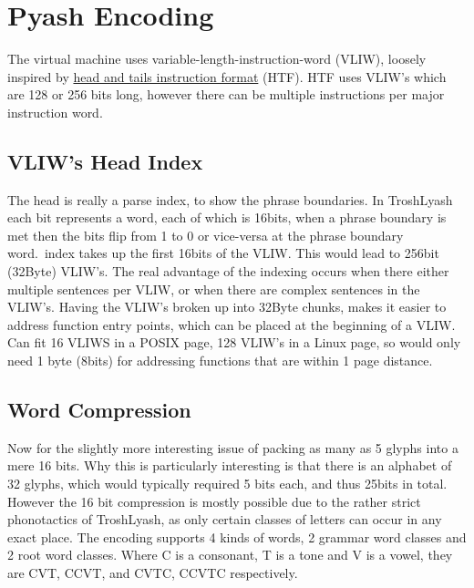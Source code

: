 %
\chapter{Pyash Encoding}

The virtual machine uses variable-length-instruction-word (VLIW),
loosely inspired by
\href{http://scale.eecs.berkeley.edu/papers/hat-cases2001.pdf}{head and
tails instruction format} (HTF). HTF uses VLIW's which are 128 or 256
bits long, however there can be multiple instructions per major
instruction word.

\section{VLIW's Head Index}\label{vliws-head-index}

The head is really a parse index, to show the phrase boundaries. In
TroshLyash each bit represents a word, each of which is 16bits, when a
phrase boundary is met then the bits flip from 1 to 0 or vice-versa at
the phrase boundary word.\ index takes up the first 16bits of the VLIW\@.
This would lead to 256bit (32Byte) VLIW's. The real advantage of the
indexing occurs when there either multiple sentences per VLIW, or when
there are complex sentences in the VLIW's. Having the VLIW's broken up
into 32Byte chunks, makes it easier to address function entry points,
which can be placed at the beginning of a VLIW\@. Can fit 16 VLIWS in a
POSIX page, 128 VLIW's in a Linux page, so would only need 1 byte
(8bits) for addressing functions that are within 1 page distance.

\section{Word Compression}\label{word-compression}

Now for the slightly more interesting issue of packing as many as 5
glyphs into a mere 16 bits. Why this is particularly interesting is that
there is an alphabet of 32 glyphs, which would typically required 5 bits
each, and thus 25bits in total. However the 16 bit compression is mostly
possible due to the rather strict phonotactics of TroshLyash, as only
certain classes of letters can occur in any exact place. The encoding
supports 4 kinds of words, 2 grammar word classes and 2 root word
classes. Where C is a consonant, T is a tone and V is a vowel, they are
CVT, CCVT, and CVTC, CCVTC respectively.

